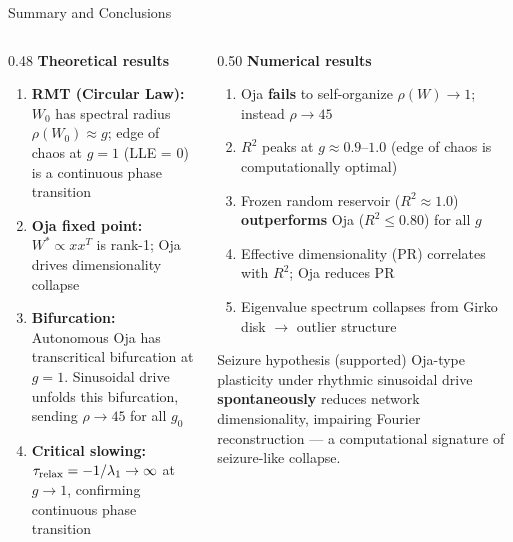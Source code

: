 \documentclass[11pt,aspectratio=169]{beamer}
\begin{document}
\begin{frame}{Summary and Conclusions}

\begin{columns}[T]
\begin{column}{0.48\textwidth}
\textbf{Theoretical results}
\begin{enumerate}
  \item \textbf{RMT (Circular Law):} $W_0$ has spectral radius $\rho(W_0) \approx g$;
        edge of chaos at $g=1$ (LLE = 0) is a continuous phase transition
  \item \textbf{Oja fixed point:} $W^* \propto xx^T$ is rank-1;
        Oja drives dimensionality collapse
  \item \textbf{Bifurcation:} Autonomous Oja has transcritical bifurcation at $g=1$.
        Sinusoidal drive unfolds this bifurcation, sending $\rho \to 45$ for all $g_0$
  \item \textbf{Critical slowing:} $\tau_{\rm relax} = -1/\lambda_1 \to \infty$ at $g\to 1$,
        confirming continuous phase transition
\end{enumerate}
\end{column}
\begin{column}{0.50\textwidth}
\textbf{Numerical results}
\begin{enumerate}
  \item Oja \textbf{fails} to self-organize $\rho(W) \to 1$; instead $\rho \to 45$
  \item $R^2$ peaks at $g \approx 0.9$--$1.0$ (edge of chaos is computationally optimal)
  \item Frozen random reservoir ($R^2 \approx 1.0$) \textbf{outperforms} Oja ($R^2 \le 0.80$) for all $g$
  \item Effective dimensionality (PR) correlates with $R^2$; Oja reduces PR
  \item Eigenvalue spectrum collapses from Girko disk $\to$ outlier structure
\end{enumerate}

\vspace{0.3em}
\begin{exampleblock}{Seizure hypothesis (supported)}
Oja-type plasticity under rhythmic sinusoidal drive \textbf{spontaneously}
reduces network dimensionality, impairing Fourier reconstruction ---
a computational signature of seizure-like collapse.
\end{exampleblock}
\end{column}
\end{columns}
\end{frame}
\end{document}
